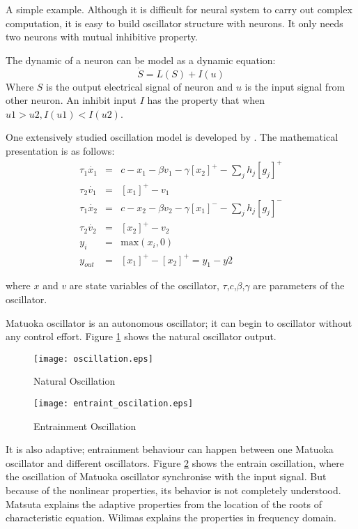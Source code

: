 A simple example.
Although it is difficult for neural system to carry out complex computation, it is easy to build oscillator structure with neurons. 
It only needs two neurons with mutual inhibitive property.

The dynamic of a neuron can be model as a dynamic equation:
\begin{equation}
\dot{S}=L(S)+I(u)
\end{equation}
Where $S$ is the output electrical signal of neuron and $u$ is the input signal from other neuron.
An inhibit input $I$ has the property that when $u1>u2,I(u1)<I(u2)$.

One extensively studied oscillation model is developed by \citet{neurooscillation}. 
The mathematical presentation is as follows:
\begin{eqnarray}
\tau_{1} \dot{x_{1}}&=&c-x_{1}-\beta v_{1}-\gamma [x_{2}]^{+}-\sum_{j}h_{j}[g_{j}]^{+}\\
\tau_{2} \dot{v_{1}}&=&[x_{1}]^{+}-v_{1}\\
\tau_{1} \dot{x_{2}}&=&c-x_{2}-\beta v_{2}-\gamma [x_{1}]^{-}-\sum_{j}h_{j}[g_{j}]^{-}\\
\tau_{2} \dot{v_{2}}&=&[x_{2}]^{+}-v_{2}\\
y_{i}&=&\mbox{max}(x_{i},0)\\
y_{out}&=&[x_{1}]^{+}-[x_{2}]^{+}=y_{1}-y{2}
\label{eq:matsuta}
\end{eqnarray}

where $x$ and $v$ are state variables of the oscillator, $\tau$,$c$,$\beta$,$\gamma$ are parameters of the oscillator.

Matuoka oscillator is an autonomous oscillator; it can begin to oscillator without any control effort.
Figure \ref{fig:natural-oscilation} shows the natural oscillator output.
\begin{figure}[h]
\texttt{[image: oscillation.eps]}
\caption{Natural Oscillation}
\label{fig:natural-oscilation}
\end{figure}

\begin{figure}[h]
\texttt{[image: entraint\_oscilation.eps]}
\caption{Entrainment Oscillation}
\label{fig:entraint-oscilation}
\end{figure}




It is also adaptive; entrainment behaviour can happen between one Matuoka oscillator and different oscillators. 
Figure \ref{fig:entraint-oscilation} shows the entrain oscillation,
where the oscillation of Matuoka oscillator synchronise with the input signal.
But because of the nonlinear properties, its behavior is not completely understood. 
Matsuta\citep{Matsuoka1987} explains the adaptive properties from the location of the roots of  characteristic equation. 
Wilimas\citep{Williamson1998} explains the properties in frequency domain.




